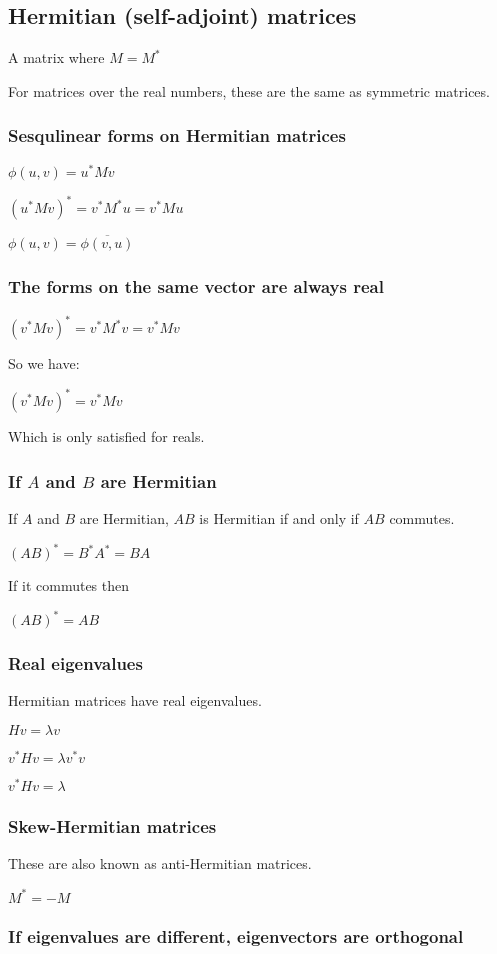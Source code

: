 
\subsection{Hermitian (self-adjoint) matrices}

A matrix where \(M=M^*\)

For matrices over the real numbers, these are the same as symmetric matrices.

\subsubsection{Sesqulinear forms on Hermitian matrices}

\(\phi (u,v)=u^*Mv\)

\((u^*Mv)^*=v^*M^*u=v^*Mu\)

\(\phi (u,v)=\overline {\phi (v,u)}\)

\subsubsection{The forms on the same vector are always real}

\((v^*Mv)^*=v^*M^*v=v^*Mv\)

So we have:

\((v^*Mv)^*=v^*Mv\)

Which is only satisfied for reals.

\subsubsection{If \(A\) and \(B\) are Hermitian}

If \(A\) and \(B\) are Hermitian, \(AB\) is Hermitian if and only if \(AB\) commutes.

\((AB)^*=B^*A^*=BA\)

If it commutes then

\((AB)^*=AB\)

\subsubsection{Real eigenvalues}

Hermitian matrices have real eigenvalues.

\(Hv=\lambda v\)

\(v^*Hv=\lambda v^*v\)

\(v^*Hv=\lambda \)

\subsubsection{Skew-Hermitian matrices}

These are also known as anti-Hermitian matrices.

\(M^*=-M\)

\subsubsection{If eigenvalues are different, eigenvectors are orthogonal}


